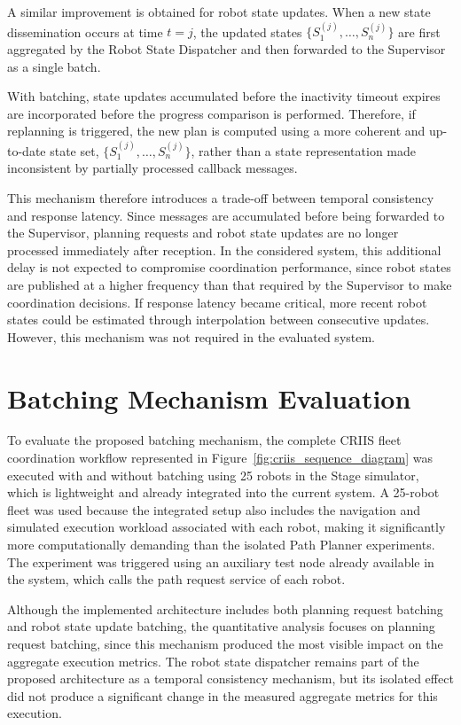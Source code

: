 A similar improvement is obtained for robot state updates. When a new state dissemination occurs at time $t=j$, the updated states $\{S_1^{(j)}, \ldots, S_n^{(j)}\}$ are first aggregated by the Robot State Dispatcher and then forwarded to the Supervisor as a single batch. 

With batching, state updates accumulated before the inactivity timeout expires are incorporated before the progress comparison is performed. Therefore, if replanning is triggered, the new plan is computed using a more coherent and up-to-date state set, $\{S_1^{(j)}, \ldots, S_n^{(j)}\}$, rather than a state representation made inconsistent by partially processed callback messages.

This mechanism therefore introduces a trade-off between temporal consistency and response latency. Since messages are accumulated before being forwarded to the Supervisor, planning requests and robot state updates are no longer processed immediately after reception. In the considered system, this additional delay is not expected to compromise coordination performance, since robot states are published at a higher frequency than that required by the Supervisor to make coordination decisions. If response latency became critical, more recent robot states could be estimated through interpolation between consecutive updates. However, this mechanism was not required in the evaluated system.


\section{Batching Mechanism Evaluation}
\label{sec:batching_evaluation}
\hspace{\parindent}
To evaluate the proposed batching mechanism, the complete CRIIS fleet coordination workflow
represented in Figure~\ref{fig:criis_sequence_diagram} was executed with and without batching
using 25 robots in the Stage simulator, which is lightweight and already integrated into the current
system. A 25-robot fleet was used because the integrated setup also includes the navigation and
simulated execution workload associated with each robot, making it significantly more
computationally demanding than the isolated Path Planner experiments. The experiment was
triggered using an auxiliary test node already available in the system, which calls the path request
service of each robot.

Although the implemented architecture includes both planning request batching and robot state
update batching, the quantitative analysis focuses on planning request batching, since this
mechanism produced the most visible impact on the aggregate execution metrics. The robot state
dispatcher remains part of the proposed architecture as a temporal consistency mechanism, but its
isolated effect did not produce a significant change in the measured aggregate metrics for this
execution.

